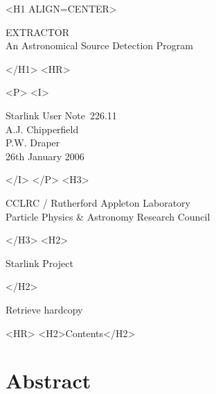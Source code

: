 \documentclass[twoside,11pt]{article}
\newcommand{\stardoccategory}  {Starlink User Note}
\newcommand{\stardocsource}    {sun\stardocnumber}
\newcommand{\stardocnumber}    {226.11}
\newcommand{\stardocauthors}   {A.J. Chipperfield\\
                                P.W. Draper}
\newcommand{\stardocdate}      {26th January 2006}
\newcommand{\stardoctitle}     {EXTRACTOR\\
                                An Astronomical Source Detection Program}
\newcommand{\htmladdnormallink}[2]{#1}
\newcommand{\htmladdimg}[1]{}
\newcommand{\htmlref}[2]{#1}
\newcommand{\htmladdtonavigation}[1]{}
\newcommand{\xlabel}[1]{}
\renewcommand{\_}{\texttt{\symbol{95}}}
\begin{document}
\begin{htmlonly}
   \xlabel{}
   \begin{rawhtml} <H1 ALIGN=CENTER> \end{rawhtml}
      \stardoctitle
   \begin{rawhtml} </H1> <HR> \end{rawhtml}

   \begin{center}
     \htmladdimg{sun226fig.gif}
   \end{center}

   \begin{rawhtml} <P> <I> \end{rawhtml}
   \stardoccategory\ \stardocnumber \\
   \stardocauthors \\
   \stardocdate
   \begin{rawhtml} </I> </P> <H3> \end{rawhtml}
      \htmladdnormallink{CCLRC / Rutherford Appleton Laboratory}
                        {http://www.cclrc.ac.uk}\\
      \htmladdnormallink{Particle Physics \& Astronomy Research Council}
                        {http://www.pparc.ac.uk} \\
   \begin{rawhtml} </H3> <H2> \end{rawhtml}
      \htmladdnormallink{Starlink Project}{http://www.starlink.ac.uk/}
   \begin{rawhtml} </H2> \end{rawhtml}
   \htmladdnormallink{\htmladdimg{source.gif} Retrieve hardcopy}
      {http://www.starlink.ac.uk/cgi-bin/hcserver?\stardocsource}\\

  \label{stardoccontents}
  \begin{rawhtml}
    <HR>
    <H2>Contents</H2>
  \end{rawhtml}
  \htmladdtonavigation{\htmlref{\htmladdimg{contents_motif.gif}}
        {stardoccontents}}

  \section{\xlabel{abstract}Abstract}
\end{htmlonly}
\end{document}
